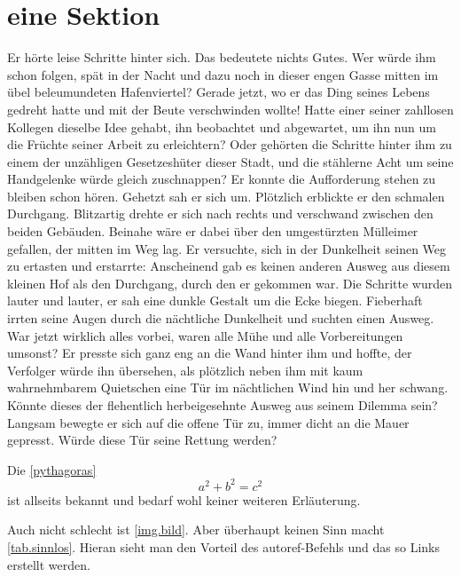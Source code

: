 \section{eine Sektion}\label{s.einesektion}
Er hörte leise Schritte hinter sich. Das bedeutete nichts Gutes. Wer würde ihm schon folgen, spät in der Nacht und dazu noch in dieser engen Gasse mitten im übel beleumundeten Hafenviertel? Gerade jetzt, wo er das Ding seines Lebens gedreht hatte und mit der Beute verschwinden wollte! Hatte einer seiner zahllosen Kollegen dieselbe Idee gehabt, ihn beobachtet und abgewartet, um ihn nun um die Früchte seiner Arbeit zu erleichtern?  Oder gehörten die Schritte hinter ihm zu einem der unzähligen Gesetzeshüter dieser Stadt, und die stählerne Acht um seine Handgelenke würde gleich zuschnappen? Er konnte die Aufforderung stehen zu bleiben schon hören. Gehetzt sah er sich um. Plötzlich erblickte er den schmalen Durchgang. Blitzartig drehte er sich nach rechts und verschwand zwischen den beiden Gebäuden. Beinahe wäre er dabei über den umgestürzten Mülleimer gefallen, der mitten im Weg lag. Er versuchte, sich in der Dunkelheit seinen Weg zu ertasten und erstarrte\cite{weranders}: Anscheinend gab es keinen anderen Ausweg aus diesem kleinen Hof als den Durchgang, durch den er gekommen war. Die Schritte wurden lauter und lauter, er sah eine dunkle Gestalt um die Ecke biegen. Fieberhaft irrten seine Augen durch die nächtliche Dunkelheit und suchten einen Ausweg. War jetzt wirklich alles vorbei, waren alle Mühe und alle Vorbereitungen umsonst? Er presste sich ganz eng an die Wand hinter ihm und hoffte, der Verfolger würde ihn übersehen, als plötzlich neben ihm mit kaum wahrnehmbarem Quietschen eine Tür im nächtlichen Wind hin und her schwang. Könnte dieses der flehentlich herbeigesehnte Ausweg aus seinem Dilemma sein? Langsam bewegte er sich auf die offene Tür zu, immer dicht an die Mauer gepresst. Würde diese Tür seine Rettung werden?



Die \autoref{pythagoras}
\begin{equation}
a^2 + b^2 = c^2 \label{pythagoras}
\end{equation}
ist allseits bekannt und bedarf wohl keiner weiteren Erläuterung.

Auch nicht schlecht ist \autoref{img.bild}. Aber überhaupt keinen Sinn macht \autoref{tab.sinnlos}. Hieran sieht man den Vorteil des autoref-Befehls und das so Links erstellt werden.

